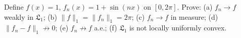 Define $f(x) = 1$, $f_n(x) = 1 + \sin(nx)$ on $[0, 2\pi]$. Prove: (a) $f_n \to f$ weakly in $\mathfrak{L}_1$; (b) $\|f\|_1 = \|f_n\|_1 = 2\pi$; (c) $f_n \to f$ in measure; (d) $\|f_n - f\|_1 \not\to 0$; (e) $f_n \not\to f$ a.e.; (f) $\mathfrak{L}_1$ is not locally uniformly convex.
